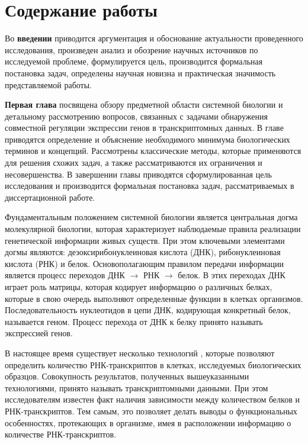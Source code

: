 \section*{Содержание работы}
Во \textbf{введении} приводится аргументация и обоснование актуальности проведенного исследования, произведен анализ и обозрение научных источников по исследуемой проблеме, формулируется цель, производится формальная постановка задач, определены научная новизна и практическая значимость представляемой работы.


\textbf{Первая глава} посвящена обзору предметной области системной биологии и детальному рассмотрению вопросов, связанных с задачами обнаружения совместной регуляции экспрессии генов в транскриптомных данных. 
В главе приводятся определение и объяснение необходимого минимума биологических терминов и концепций. Рассмотрены классические методы, которые применяются для решения схожих задач, а также рассматриваются их ограничения и несовершенства. 
В завершении главы приводятся сформулированная цель исследования и производится формальная постановка задач, рассматриваемых в диссертационной работе.

Фундаментальным положением системной биологии является центральная догма молекулярной биологии, которая характеризует наблюдаемые правила реализации генетической информации живых существ.
При этом ключевыми элементами догмы являются: дезоксирибонуклеиновая кислота (ДНК), рибонуклеиновая кислота (РНК) и белок.
Основополагающим правилом передачи информации является процесс переходов {ДНК $\rightarrow$ РНК $\rightarrow$ белок}.
В этих переходах ДНК играет роль матрицы, которая кодирует информацию о различных белках, которые в свою очередь выполняют определенные функции в клетках организмов.
Последовательность нуклеотидов в цепи ДНК, кодирующая конкретный белок, называется геном.
Процесс перехода от ДНК к белку принято называть экспрессией генов.

В настоящее время существует несколько технологий \fixme{\cite{}}, которые позволяют определить количество РНК-транскриптов в клетках, исследуемых биологических образцов.
Совокупность результатов, полученных вышеуказанными технологиями, принято называть транскриптомными данными.
При этом исследователям известен факт наличия зависимости между количеством белков и РНК-транскриптов.
Тем самым, это позволяет делать выводы о функциональных особенностях, протекающих в организме, имея в расположении информацию о количестве РНК-транскриптов.


